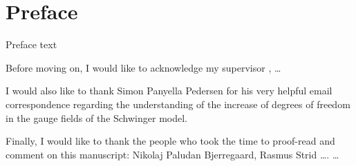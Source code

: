 \documentclass[../main.tex]{subfiles} %
\begin{document}
\chapter*{Preface}

Preface text


Before moving on, I would like to acknowledge my supervisor \Supervisor, \ldots

I would also like to thank Simon Panyella Pedersen for his very helpful email correspondence regarding the understanding of the increase of degrees of freedom in the gauge fields of the Schwinger model.

Finally, I would like to thank the people who took the time to proof-read and comment on this manuscript: Nikolaj Paludan Bjerregaard, Rasmus Strid \ldots. \ldots




\end{document}
